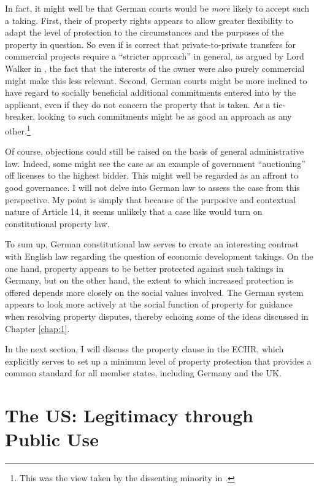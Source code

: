 {In fact, it might well be that German courts would be {\it more} likely to accept such a taking. First, their  of property rights appears to allow greater flexibility to adapt the level of protection to the circumstances and the purposes of the property in question. So even if is correct that private-to-private transfers for commercial projects require a ``stricter approach'' in general, as argued by Lord Walker in \textcite{sainsbury10}, the fact that the interests of the owner were also purely commercial  might make this less relevant. Second, German courts might be more inclined to have regard to socially beneficial additional commitments entered into by the applicant, even if they do not concern the property that is taken. As a tie-breaker, looking to such commitments might be as good an approach as any other.\footnote{This was the view taken by the dissenting minority in \textcite{sainsbury10}.}

Of course, objections could still be raised on the basis of general administrative law. Indeed, some might see the case as an example of government ``auctioning'' off licenses to the highest bidder. This might well be regarded as an affront to good governance. I will not delve into German law to assess the case from this perspective. My point is simply that because of the purposive and contextual nature of Article 14, it seems unlikely that a case like \textcite{sainsbury10} would turn on constitutional property law.

To sum up, German constitutional law serves to create an interesting contrast with English law regarding the question of economic development takings. On the one hand, property appears to be better protected against such takings in Germany, but on the other hand, the extent to which increased protection is offered depends more closely on the social values involved. The German system appears to look more actively at the social function of property for guidance when resolving property disputes, thereby echoing some of the ideas discussed in Chapter \ref{chap:1}. 

In the next section, I will discuss the property clause in the ECHR, which explicitly serves to set up a minimum level of property protection that provides a common standard for all member states, including Germany and the UK.
}

\section{The US: Legitimacy through Public Use}\label{sec:us}

